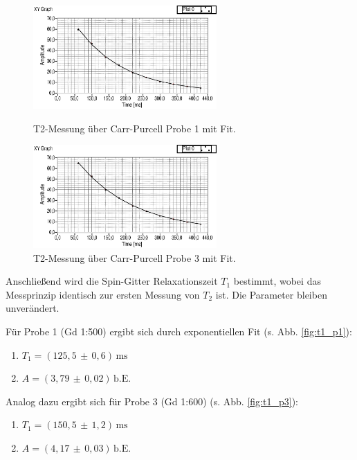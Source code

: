\documentclass[a4paper]{scrartcl} %
\newcommand{\err}[2]{( #1 \, \pm \, #2 )} %
\newcommand{\ms}{\, \mathrm{ms}}
\newcommand{\be}{\, \mathrm{b.E.}}
\begin{document}
\begin{figure}[H]
	\centering
	\parbox{70mm}{
		\centering
		\includegraphics[width=70mm]{./Resources/t2_p1_cp.eps}
		\caption{T2-Messung über Carr-Purcell Probe 1 mit Fit.}
		\label{fig:t2_p1_cp}
	}
	\hspace*{\fill}
	\parbox{70mm}{
		\centering
		\includegraphics[width=70mm]{./Resources/t2_p3_cp.eps}
		\caption{T2-Messung über Carr-Purcell Probe 3 mit Fit.}
		\label{fig:t2_p3_cp}
	}
\end{figure}
Anschließend wird die Spin-Gitter Relaxationszeit $T_1$ bestimmt, wobei das Messprinzip identisch zur ersten Messung von $T_2$ ist. Die Parameter bleiben unverändert.

Für Probe 1 (Gd 1:500) ergibt sich durch exponentiellen Fit (s. Abb. \ref{fig:t1_p1}):
\begin{enumerate}
	\item[] $T_1 = \err{125,5}{0,6} \ms$
	\item[] $A = \err{3,79}{0,02} \be$
\end{enumerate}
Analog dazu ergibt sich für Probe 3 (Gd 1:600) (s. Abb. \ref{fig:t1_p3}):
\begin{enumerate}
	\item[] $T_1 = \err{150,5}{1,2} \ms$
	\item[] $A = \err{4,17}{0,03} \be$
\end{enumerate}
\end{document}
